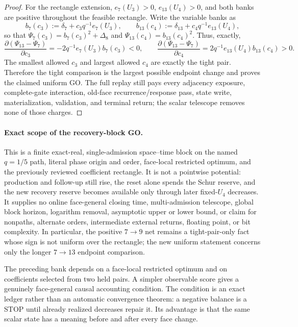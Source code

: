 \begin{proof}
For the rectangle extension, $e_7(U_3)>0$, $e_{13}(U_4)>0$, and both banks
are positive throughout the feasible rectangle.  Write the variable banks as
\begin{equation*}
 b_7(c_3):=\delta_7+c_3q^{-1}e_7(U_3),
 \qquad
 b_{13}(c_4):=\delta_{13}+c_4q^{-1}e_{13}(U_4),
\end{equation*}
so that $\Psi_7(c_3)=b_7(c_3)^2+\Delta_8$ and
$\Psi_{13}(c_4)=b_{13}(c_4)^2$.  Thus, exactly,
\begin{equation*}
 \frac{\partial(\Psi_{13}-\Psi_7)}{\partial c_3}
 =-2q^{-1}e_7(U_3)b_7(c_3)<0,
 \qquad
 \frac{\partial(\Psi_{13}-\Psi_7)}{\partial c_4}
 =2q^{-1}e_{13}(U_4)b_{13}(c_4)>0.
\end{equation*}
The smallest allowed $c_3$ and largest allowed $c_4$ are exactly the tight
pair.  Therefore the tight comparison is the largest possible endpoint
change and proves the claimed uniform GO.  The
full replay still pays every adjacency exposure, complete-gate interaction,
old-face recurrence/response pass, state write, materialization, validation,
and terminal return; the scalar telescope removes none of those charges.
\end{proof}

\paragraph{Exact scope of the recovery-block GO.}
This is a finite exact-real, single-admission space--time block on the named
$q=1/5$ path, literal phase origin and order, face-local restricted optimum,
and the previously reviewed coefficient rectangle.  It is not a pointwise
potential: production and follow-up still rise, the reset alone spends the
Schur reserve, and the new recovery reserve becomes available only through
later fixed-$U_4$ decreases.  It supplies no online face-general closing time,
multi-admission telescope, global block horizon, logarithm removal,
asymptotic upper or lower bound, or claim for nonpaths, alternate orders,
intermediate external returns, floating point, or bit complexity.  In
particular, the positive $7\to9$ net remains a tight-pair-only fact whose sign
is not uniform over the rectangle; the new uniform statement concerns only
the longer $7\to13$ endpoint comparison.

The preceding bank depends on a face-local restricted optimum and on
coefficients selected from two held pairs.  A simpler observable score gives
a genuinely face-general causal accounting condition.  The condition is an
exact ledger rather than an automatic convergence theorem: a negative balance
is a STOP until already realized decreases repair it.  Its advantage is that
the same scalar state has a meaning before and after every face change.

